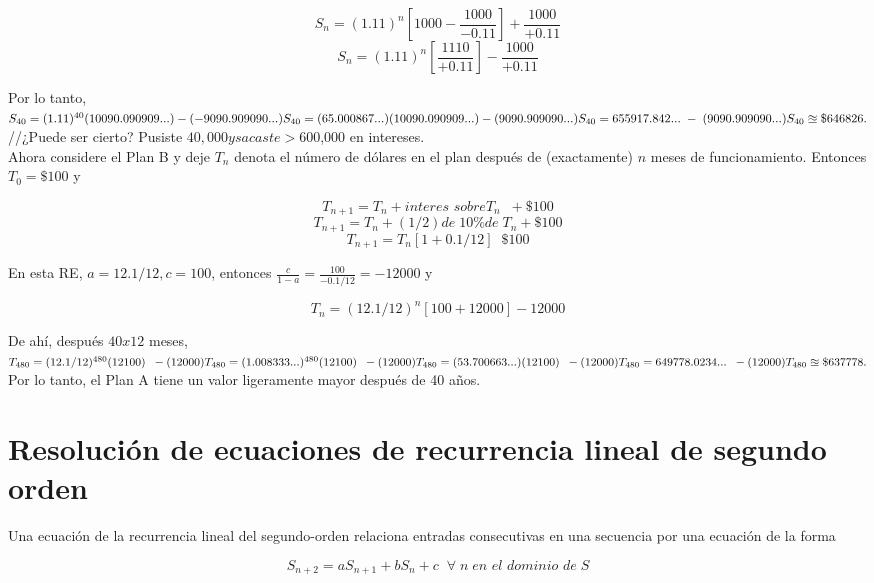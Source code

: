 \documentclass{article}
\begin{document}
$$S_{n}= (1.11)^{n} \left[1000 - \frac{1000}{-0.11}\right] + \frac{1000}{+0.11}$$
$$S_{n}=(1.11)^{n}\left[\frac{1110}{+0.11}\right]- \frac{1000}{+0.11}$$

Por lo tanto,\\
$S_{40} = (1.11)^{40} (10090.090909...) - (-9090.909090...)\\
S_{40}=(65.000867...)(10090.090909...)-(9090.909090...)\\
S_{40}=655917.842...\; - \; (9090.909090...)\\
S_{40} \approxeq \$646826.$ \\

//¿Puede ser cierto? Pusiste $40,000 y sacaste > $600,000 en intereses.\\

Ahora considere el Plan B y deje $T_n$ denota el número de dólares en el plan después de (exactamente) $n$ meses de funcionamiento. Entonces $T_0 = \$100$ y

$$T_{n+1} = T_{n} + \textit{interes sobre} T_{n} \;\; + \$100$$
$$T_{n+1} = T_{n} + (1/2) \textit{de}\; 10\% \textit{de}\; T_{n} + \$100$$
$$T_{n+1} = T_{n}[1+0.1/12] \;\; \$100$$

En esta RE, $a=12.1/12, c=100$, entonces $\frac{c}{1-a} = \frac{100}{-0.1/12} = -12000$ y

$$T_n = (12.1/12)^{n}[100 + 12000] - 12000$$

De ahí, después $40x12$ meses,\\

$
T_{480}=(12.1/12)^{480}(12100) \;\; -(12000)\\
T_{480}=(1.008333...)^{480}(12100)\;\; -(12000)\\
T_{480}=(53.700663...)(12100)\;\; -(12000)\\
T_{480}=649778.0234... \;\; -(12000)\\
T_{480}\approxeq \$637778.
$\\
Por lo tanto, el Plan A tiene un valor ligeramente mayor después de 40 años.

\section{Resolución de ecuaciones de recurrencia lineal de segundo orden}

Una ecuación de la recurrencia lineal del segundo-orden relaciona entradas consecutivas en una secuencia por una ecuación de la forma

\begin{equation}
  S_{n+2} = aS_{n+1} + bS_{n} + c \;\; \forall\; n \; \textit{en el dominio de} \; S
\end{equation}
\end{document}
